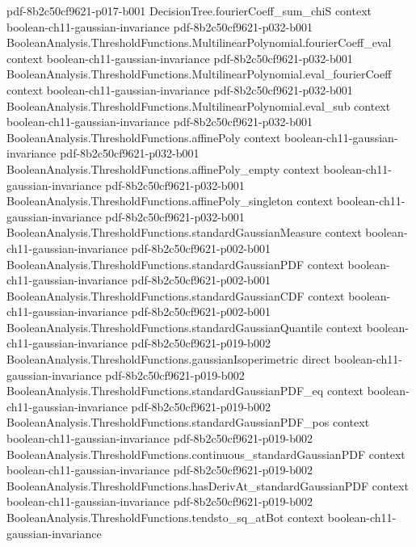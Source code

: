 \begin{theorem}
  {pdf-8b2c50cf9621-p017-b001}
\proofstep
  {DecisionTree.fourierCoeff_sum_chiS}
  {context}
  {boolean-ch11-gaussian-invariance}
  {pdf-8b2c50cf9621-p032-b001}
\proofstep
  {BooleanAnalysis.ThresholdFunctions.MultilinearPolynomial.fourierCoeff_eval}
  {context}
  {boolean-ch11-gaussian-invariance}
  {pdf-8b2c50cf9621-p032-b001}
\proofstep
  {BooleanAnalysis.ThresholdFunctions.MultilinearPolynomial.eval_fourierCoeff}
  {context}
  {boolean-ch11-gaussian-invariance}
  {pdf-8b2c50cf9621-p032-b001}
\proofstep
  {BooleanAnalysis.ThresholdFunctions.MultilinearPolynomial.eval_sub}
  {context}
  {boolean-ch11-gaussian-invariance}
  {pdf-8b2c50cf9621-p032-b001}
\proofstep
  {BooleanAnalysis.ThresholdFunctions.affinePoly}
  {context}
  {boolean-ch11-gaussian-invariance}
  {pdf-8b2c50cf9621-p032-b001}
\proofstep
  {BooleanAnalysis.ThresholdFunctions.affinePoly_empty}
  {context}
  {boolean-ch11-gaussian-invariance}
  {pdf-8b2c50cf9621-p032-b001}
\proofstep
  {BooleanAnalysis.ThresholdFunctions.affinePoly_singleton}
  {context}
  {boolean-ch11-gaussian-invariance}
  {pdf-8b2c50cf9621-p032-b001}
\proofstep
  {BooleanAnalysis.ThresholdFunctions.standardGaussianMeasure}
  {context}
  {boolean-ch11-gaussian-invariance}
  {pdf-8b2c50cf9621-p002-b001}
\proofstep
  {BooleanAnalysis.ThresholdFunctions.standardGaussianPDF}
  {context}
  {boolean-ch11-gaussian-invariance}
  {pdf-8b2c50cf9621-p002-b001}
\proofstep
  {BooleanAnalysis.ThresholdFunctions.standardGaussianCDF}
  {context}
  {boolean-ch11-gaussian-invariance}
  {pdf-8b2c50cf9621-p002-b001}
\proofstep
  {BooleanAnalysis.ThresholdFunctions.standardGaussianQuantile}
  {context}
  {boolean-ch11-gaussian-invariance}
  {pdf-8b2c50cf9621-p019-b002}
\proofstep
  {BooleanAnalysis.ThresholdFunctions.gaussianIsoperimetric}
  {direct}
  {boolean-ch11-gaussian-invariance}
  {pdf-8b2c50cf9621-p019-b002}
\proofstep
  {BooleanAnalysis.ThresholdFunctions.standardGaussianPDF_eq}
  {context}
  {boolean-ch11-gaussian-invariance}
  {pdf-8b2c50cf9621-p019-b002}
\proofstep
  {BooleanAnalysis.ThresholdFunctions.standardGaussianPDF_pos}
  {context}
  {boolean-ch11-gaussian-invariance}
  {pdf-8b2c50cf9621-p019-b002}
\proofstep
  {BooleanAnalysis.ThresholdFunctions.continuous_standardGaussianPDF}
  {context}
  {boolean-ch11-gaussian-invariance}
  {pdf-8b2c50cf9621-p019-b002}
\proofstep
  {BooleanAnalysis.ThresholdFunctions.hasDerivAt_standardGaussianPDF}
  {context}
  {boolean-ch11-gaussian-invariance}
  {pdf-8b2c50cf9621-p019-b002}
\proofstep
  {BooleanAnalysis.ThresholdFunctions.tendsto_sq_atBot}
  {context}
  {boolean-ch11-gaussian-invariance}

\end{theorem}
